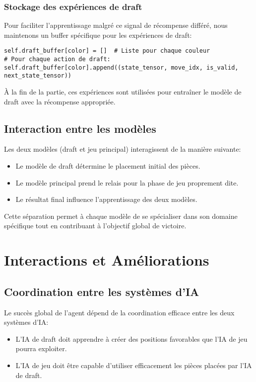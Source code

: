 \documentclass[]{article}
\begin{document}
\subsubsection{Stockage des expériences de draft}
Pour faciliter l'apprentissage malgré ce signal de récompense différé, nous maintenons un buffer spécifique pour les expériences de draft:
\begin{verbatim}
self.draft_buffer[color] = []  # Liste pour chaque couleur
# Pour chaque action de draft:
self.draft_buffer[color].append((state_tensor, move_idx, is_valid, next_state_tensor))
\end{verbatim}

À la fin de la partie, ces expériences sont utilisées pour entraîner le modèle de draft avec la récompense appropriée.

\subsection{Interaction entre les modèles}
Les deux modèles (draft et jeu principal) interagissent de la manière suivante:
\begin{itemize}
    \item Le modèle de draft détermine le placement initial des pièces.
    \item Le modèle principal prend le relais pour la phase de jeu proprement dite.
    \item Le résultat final influence l'apprentissage des deux modèles.
\end{itemize}

Cette séparation permet à chaque modèle de se spécialiser dans son domaine spécifique tout en contribuant à l'objectif global de victoire.

\section{Interactions et Améliorations}

\subsection{Coordination entre les systèmes d'IA}
Le succès global de l'agent dépend de la coordination efficace entre les deux systèmes d'IA:
\begin{itemize}
    \item L'IA de draft doit apprendre à créer des positions favorables que l'IA de jeu pourra exploiter.
    \item L'IA de jeu doit être capable d'utiliser efficacement les pièces placées par l'IA de draft.
\end{itemize}
\end{document}
